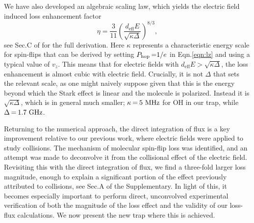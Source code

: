 \documentclass[%
 reprint,
 amsmath,amssymb,
 aps,
prl,
]{revtex4-1}
\newcommand{\epb}{{$\vec{E}\s {\perp}\s\vec{B}$}}
\newcommand{\s}{{\nobreak\hspace{.2em}}}
\begin{document}
We have also developed an algebraic scaling law, which yields the electric field induced loss enhancement factor
\begin{equation}
\eta=\frac{3}{11} \left(\frac{d_\text{eff}E}{\sqrt{\kappa\Delta}}\right)^{8/3},
\end{equation}
see Sec.\s C of\s\cite{ssm} for the full derivation.
Here $\kappa$ represents a characteristic energy scale for spin-flips that can be derived by setting $P_\text{hop}\s {=}1/e$ in Eqn.\s\ref{eqn:lz} and using a typical value of $v_z$.
This means that for electric fields with $d_\text{eff}E>\sqrt{\kappa\Delta}$, the loss enhancement is almost cubic with electric field.
Crucially, it is not $\Delta$ that sets the relevant scale, as one might naively suppose given that this is the energy beyond which the Stark effect is linear and the molecule is polarized.
Instead it is $\sqrt{\kappa\Delta}$, which is in general much smaller; $\kappa\s {=}\s 5\text{ MHz}$ for OH in our trap, while $\Delta\s {=}\s1.7\text{ GHz}$.

Returning to the numerical approach, the direct integration of flux is a key improvement relative to our previous work\s\cite{Stuhl2013}, where electric fields were applied to study collisions.
The mechanism of molecular spin-flip loss was identified, and an attempt was made to deconvolve it from the collisional effect of the electric field.
Revisiting this with the direct integration of flux, we find a three-fold larger loss magnitude, enough to explain a significant portion of the effect previously attributed to collisions, see Sec.\s A of the Supplementary\s\cite{ssm}.
In light of this, it becomes especially important to perform direct, unconvolved experimental verification of both the magnitude of the loss effect and the validity of our loss-flux calculations.
We now present the new trap where this is achieved.
\end{document}
